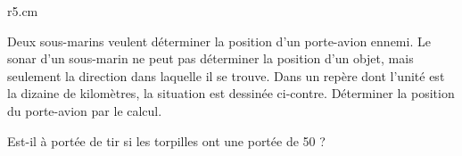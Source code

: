 
\begin{exercice}\label{exosmath-0617}

\begin{wrapfigure}{r}{5.cm}
   \vspace{-0.5cm}        %
   \centering
   
\end{wrapfigure}

    Deux sous-marins veulent déterminer la position d'un porte-avion ennemi. Le sonar d'un sous-marin ne peut pas déterminer la position d'un objet, mais seulement la direction dans laquelle il se trouve. Dans un repère dont l'unité est la dizaine de kilomètres, la situation est dessinée ci-contre. Déterminer la position du porte-avion par le calcul.

    Est-il à portée de tir si les torpilles ont une portée de \unit{50}{\kilo\meter} ?


\end{exercice}

